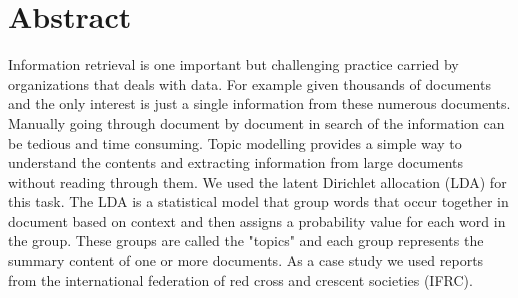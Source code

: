 
\chapter*{Abstract} 
Information retrieval is one  important but challenging practice carried by organizations that deals with data. For example given thousands of documents and the only interest is just a single information from these numerous documents. Manually going through document by document  in search of the information can be tedious and time consuming.
Topic modelling  provides a simple way to understand the contents and extracting information from  large documents without  reading through them. We used the latent Dirichlet allocation (LDA) for this task. The LDA  is a statistical model that group words that occur together in document based on context and then assigns a probability value for each word in the group. These groups are called the "topics" and each group represents the summary content of one or more documents. 
As a case study we used reports from the international federation of red cross and crescent societies (IFRC). 


%
%
%





